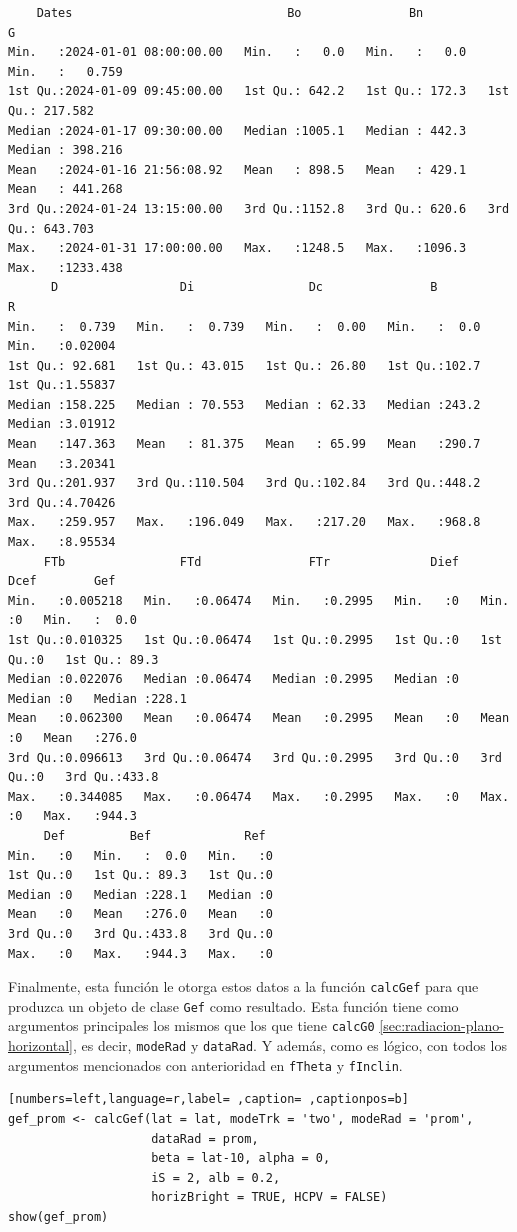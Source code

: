 \begin{itemize}
\begin{verbatim}
    Dates                              Bo               Bn               G           
Min.   :2024-01-01 08:00:00.00   Min.   :   0.0   Min.   :   0.0   Min.   :   0.759  
1st Qu.:2024-01-09 09:45:00.00   1st Qu.: 642.2   1st Qu.: 172.3   1st Qu.: 217.582  
Median :2024-01-17 09:30:00.00   Median :1005.1   Median : 442.3   Median : 398.216  
Mean   :2024-01-16 21:56:08.92   Mean   : 898.5   Mean   : 429.1   Mean   : 441.268  
3rd Qu.:2024-01-24 13:15:00.00   3rd Qu.:1152.8   3rd Qu.: 620.6   3rd Qu.: 643.703  
Max.   :2024-01-31 17:00:00.00   Max.   :1248.5   Max.   :1096.3   Max.   :1233.438  
      D                 Di                Dc               B               R          
Min.   :  0.739   Min.   :  0.739   Min.   :  0.00   Min.   :  0.0   Min.   :0.02004  
1st Qu.: 92.681   1st Qu.: 43.015   1st Qu.: 26.80   1st Qu.:102.7   1st Qu.:1.55837  
Median :158.225   Median : 70.553   Median : 62.33   Median :243.2   Median :3.01912  
Mean   :147.363   Mean   : 81.375   Mean   : 65.99   Mean   :290.7   Mean   :3.20341  
3rd Qu.:201.937   3rd Qu.:110.504   3rd Qu.:102.84   3rd Qu.:448.2   3rd Qu.:4.70426  
Max.   :259.957   Max.   :196.049   Max.   :217.20   Max.   :968.8   Max.   :8.95534  
     FTb                FTd               FTr              Dief        Dcef        Gef       
Min.   :0.005218   Min.   :0.06474   Min.   :0.2995   Min.   :0   Min.   :0   Min.   :  0.0  
1st Qu.:0.010325   1st Qu.:0.06474   1st Qu.:0.2995   1st Qu.:0   1st Qu.:0   1st Qu.: 89.3  
Median :0.022076   Median :0.06474   Median :0.2995   Median :0   Median :0   Median :228.1  
Mean   :0.062300   Mean   :0.06474   Mean   :0.2995   Mean   :0   Mean   :0   Mean   :276.0  
3rd Qu.:0.096613   3rd Qu.:0.06474   3rd Qu.:0.2995   3rd Qu.:0   3rd Qu.:0   3rd Qu.:433.8  
Max.   :0.344085   Max.   :0.06474   Max.   :0.2995   Max.   :0   Max.   :0   Max.   :944.3  
     Def         Bef             Ref   
Min.   :0   Min.   :  0.0   Min.   :0  
1st Qu.:0   1st Qu.: 89.3   1st Qu.:0  
Median :0   Median :228.1   Median :0  
Mean   :0   Mean   :276.0   Mean   :0  
3rd Qu.:0   3rd Qu.:433.8   3rd Qu.:0  
Max.   :0   Max.   :944.3   Max.   :0
\end{verbatim}
\end{itemize}

Finalmente, esta función le otorga estos datos a la función \texttt{calcGef} para que produzca un objeto de clase \texttt{Gef} como resultado. Esta función tiene como argumentos principales los mismos que los que tiene \texttt{calcG0} \ref{sec:radiacion-plano-horizontal}, es decir, \texttt{modeRad} y \texttt{dataRad}. Y además, como es lógico, con todos los argumentos mencionados con anterioridad en \texttt{fTheta} y \texttt{fInclin}.
\begin{lstlisting}[numbers=left,language=r,label= ,caption= ,captionpos=b]
gef_prom <- calcGef(lat = lat, modeTrk = 'two', modeRad = 'prom',
                    dataRad = prom,
                    beta = lat-10, alpha = 0,
                    iS = 2, alb = 0.2,
                    horizBright = TRUE, HCPV = FALSE)
show(gef_prom)
\end{lstlisting}

